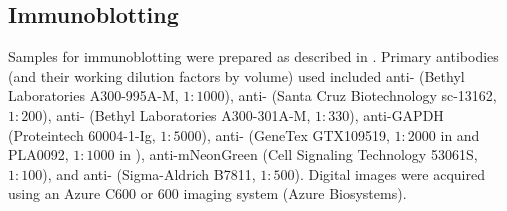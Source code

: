 \subsection{Immunoblotting}

Samples for immunoblotting were prepared as described in . Primary antibodies (and their working dilution factors by volume) used included anti- (Bethyl Laboratories A300-995A-M, $1 : 1000$), anti- (Santa Cruz Biotechnology sc-13162, $1 : 200$), anti- (Bethyl Laboratories A300-301A-M, $1 : 330$), anti-GAPDH (Proteintech 60004-1-Ig, $1 : 5000$), anti- (GeneTex GTX109519, $1 : 2000$ in  and PLA0092, $1 : 1000$ in ), anti-mNeonGreen (Cell Signaling Technology 53061S, $1 : 100$), and anti- (Sigma-Aldrich B7811, $1 : 500$). Digital images were acquired using an Azure C600 or 600 imaging system (Azure Biosystems).